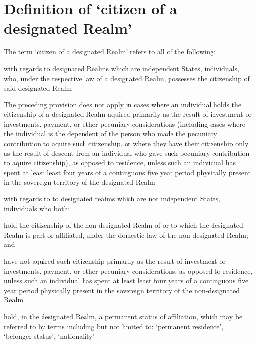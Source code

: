 \documentclass[private]{ukbill}
\begin{document}
\section{Definition of `citizen of a designated Realm'}
\begin{numstat}
\item The term `citizen of a designated Realm' refers to all of the following:
\begin{alphstat}
	\item  with regards to designated Realms which are independent States, individuals, who, under the respective law of a designated Realm, possesses the citizenship of said designated Realm
	\begin{romstat}
		\item The preceding provision does not apply in cases where an individual holds the citizenship of a designated Realm aquired  primarily as the result of investment or investments, payment, or other pecuniary  considerations (including cases where the individual is the dependent of the person who made the pecuniary contribution  to aquire such citizenship, or where they have their citizenship only as the result of descent from an individual who gave such pecuniary contribution to aquire citizenship), as opposed to residence, unless such an individual has  spent at least least four years  of a continguous five year period  physically present in the sovereign territory of the designated Realm 
	\end{romstat}
	\item with regards to to designated realms which are not independent States, individuals who both:
\begin{romstat}
	\item hold the citizenship of the non-designated Realm of or to which the designated Realm is part  or affiliated, under the domestic law of the non-designated Realm; and
	\item have not aquired such citizenship primarily as the result of investment or investments, payment, or other pecuniary  considerations, as opposed to residence, unless such an individual has  spent at least least four years  of a continguous five year period  physically present in the sovereign territory of the non-designated Realm 
	\item hold, in the designated Realm, a permanent status of affiliation, which may be referred to by terms including but not limited to: `permanent residence', `belonger status', `nationality'
\end{romstat}
\end{alphstat}
	
\end{numstat}
\end{document}
